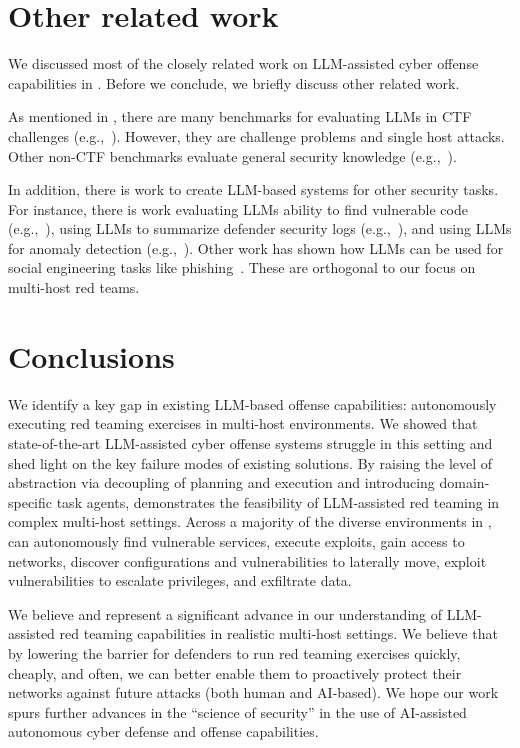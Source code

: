 \section{Other related work}

We discussed most of the closely related work on LLM-assisted cyber offense capabilities   in .
Before we conclude, we briefly discuss other related work.


As mentioned in , there are many benchmarks for evaluating LLMs in CTF challenges (e.g.,~\cite{shao2024nyu_ctf, intercode_ctf, cyberseceval3, cyberseceval3, anurin2024catastrophic, googleFramework}).  However, they are challenge problems and single host attacks.
Other non-CTF benchmarks  evaluate  general security knowledge (e.g.,~\cite{tihanyi2024cybermetric}).

In addition, there is work to create LLM-based systems for other security tasks.
For instance, there is work evaluating LLMs ability to find vulnerable code (e.g.,~\cite{cyberseceval3}), using LLMs to summarize defender security logs (e.g.,~\cite{microsoft_security_copilot}), and using   LLMs for anomaly detection (e.g.,~\cite{elhafsi2023semantic}).
 Other work has shown how LLMs can be used for social engineering tasks like phishing~\cite{llm_phishing, heiding2024auto_phish}. These  are orthogonal to our focus on multi-host red teams.

\section{Conclusions}
We identify a key gap in existing LLM-based offense capabilities: autonomously executing red teaming exercises in multi-host environments.
We showed that state-of-the-art LLM-assisted cyber offense systems  struggle in this setting and shed light on the key failure modes of existing solutions.
By raising the level of abstraction via decoupling of planning and execution and introducing domain-specific task agents, \sys  demonstrates the feasibility  of   LLM-assisted red teaming in complex multi-host settings. Across a majority of the  diverse  environments in \benchmark,  \sys can autonomously find vulnerable services,  execute exploits, gain access to networks, discover configurations and vulnerabilities to laterally move, exploit vulnerabilities to escalate privileges, and exfiltrate data.

We believe \sys  and \benchmark represent  a significant advance in our understanding of    LLM-assisted  red teaming capabilities in realistic multi-host settings.  We believe that by   lowering the barrier for defenders to  run red teaming exercises quickly, cheaply, and often, we can better enable them to proactively protect their networks against future attacks (both human and AI-based).  We hope our work  spurs  further advances in the ``science of security''  in the  use of AI-assisted autonomous cyber defense and offense capabilities.

